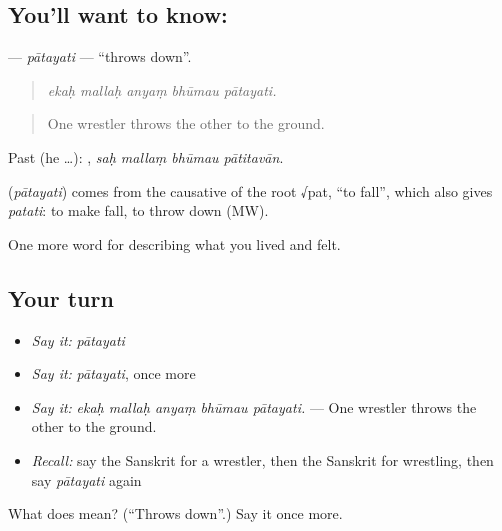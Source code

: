\subsection*{You'll want to know: }
\textbf{} — \emph{pātayati} — \textquotedblleft{}throws down\textquotedblright{}.

\begin{quote}
    
\end{quote}

\begin{quote}
\emph{ekaḥ mallaḥ anyaṃ bhūmau pātayati.}
\end{quote}

\begin{quote}
One wrestler throws the other to the ground.
\end{quote}

Past (he …):    , \emph{saḥ mallaṃ bhūmau pātitavān}.

\begin{cousinweb}
\textbf{} (\emph{pātayati}) comes from the causative of the root √pat, \textquotedblleft{}to fall\textquotedblright{}, which also gives \emph{patati}: to make fall, to throw down (MW).
\end{cousinweb}

\begin{grammarlens}[title={What you've built}]
One more word for describing what you lived and felt.
\end{grammarlens}

\subsection*{Your turn}
\begin{itemize}
\raggedright
  \item \emph{Say it:} \emph{pātayati}
  \item \emph{Say it:} \emph{pātayati}, once more
  \item \emph{Say it:} \emph{ekaḥ mallaḥ anyaṃ bhūmau pātayati.} — One wrestler throws the other to the ground.
  \item \emph{Recall:} say the Sanskrit for a wrestler, then the Sanskrit for wrestling, then say \emph{pātayati} again
\end{itemize}

\begin{tcolorbox}[breakable,colback=teal!4,colframe=teal!35!black,title={Before you move on}]
What does  mean? (\textquotedblleft{}Throws down\textquotedblright{}.) Say it once more.
\end{tcolorbox}
